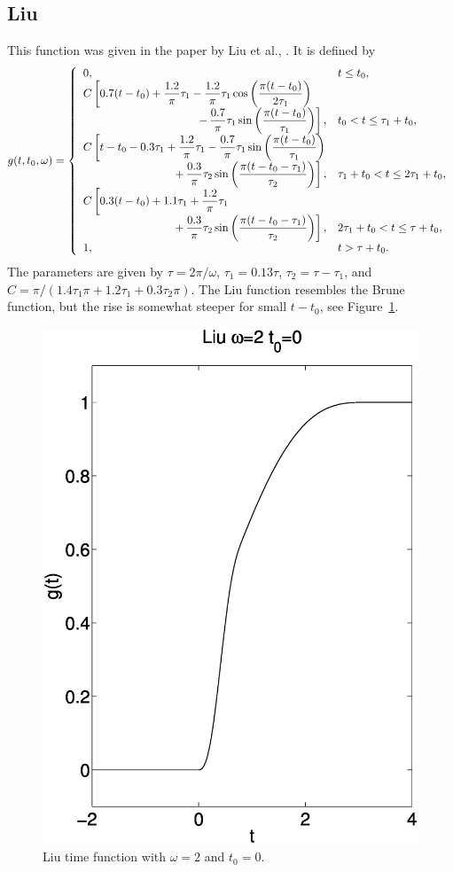 \documentclass[11pt]{report}
\renewcommand{\arraystretch}{1.3}
\begin{document}
\subsection{Liu}
\renewcommand{\arraystretch}{1.5}
This function was given in the paper by Liu et al., \cite{liuetal_2006}. 
It is defined by 
\[
g(t,t_0,\omega) = \left\{ 
\begin{array}{ll}
  0, & t \leq t_0, \\
  C\left[0.7(t-t_0) + \dfrac{1.2}{\pi}\tau_1 - \dfrac{1.2}{\pi}\tau_1
  \cos\left(\dfrac{\pi (t-t_0)}{2\tau_1}\right) \right. & \\
     \hfill \left. -\,\dfrac{0.7}{\pi}\tau_1\sin\left(\dfrac{\pi (t-t_0)}{\tau_1}\right)\right],  & 
     t_0 < t \leq \tau_1+t_0, \\
%
  C\left[t-t_0-0.3\tau_1+\dfrac{1.2}{\pi}\tau_1-\dfrac{0.7}{\pi}\tau_1\sin\left(\dfrac{\pi
    (t-t_0)}{\tau_1}\right)\right. & \\ 
    \hfill
    \left. +\,\dfrac{0.3}{\pi}\tau_2\sin\left(\dfrac{\pi(t-t_0-\tau_1)}{\tau_2}\right)\right], &  
    \tau_1+t_0 < t \leq 2\tau_1+t_0, \\
%
  C\left[0.3(t-t_0)+1.1\tau_1+\dfrac{1.2}{\pi}\tau_1\right. & \\
    \hfill
    \left. +\,\dfrac{0.3}{\pi}\tau_2\sin\left(\dfrac{\pi(t-t_0-\tau_1)}{\tau_2}\right)\right], & 
    2\tau_1+t_0 < t \leq \tau+t_0, \\
  1,  &  t > \tau +t_0.
\end{array} \right.
\]
\noindent The parameters are given by $\tau=2\pi/\omega$, $\tau_1=0.13\tau$, $\tau_2 = \tau-\tau_1$,
and $C=\pi/(1.4\tau_1\pi+1.2\tau_1+0.3\tau_2\pi)$.  The Liu function resembles the Brune function,
but the rise is somewhat steeper for small $t-t_0$, see Figure~\ref{fig:liu}.
\begin{figure}
\begin{centering}
  \includegraphics[width=0.4\linewidth]{f12-liu.ps}
  \caption{Liu time function with $\omega=2$ and $t_0=0$.}
  \label{fig:liu}
\end{centering}
\end{figure}  
\end{document}
